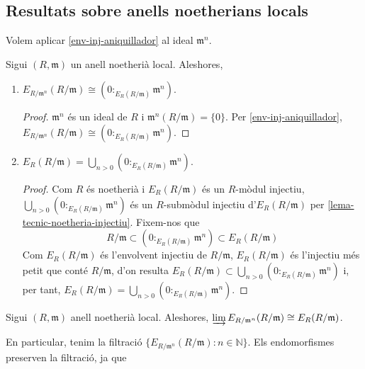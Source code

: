 \subsection{Resultats sobre anells noetherians locals}
Volem aplicar \ref{env-inj-aniquillador} al ideal $\mathfrak{m}^{n}$.
\begin{proposicio}
    Sigui $(R,\mathfrak{m})$ un anell noetherià local. Aleshores,
    \begin{enumerate}
        \item $E_{R/\mathfrak{m}^{n}}(R/\mathfrak{m})\cong(0:_{E_{R}(R/\mathfrak{m})}\mathfrak{m}^{n})$.
        \begin{proof}
            $\mathfrak{m}^{n}$ és un ideal de $R$ i $\mathfrak{m}^{n}(R/\mathfrak{m})=\{0\}$. Per \ref{env-inj-aniquillador}, $E_{R/\mathfrak{m}^{n}}(R/\mathfrak{m})\cong(0:_{E_{R}(R/\mathfrak{m})}\mathfrak{m}^{n})$.
        \end{proof}
        \item $E_{R}(R/\mathfrak{m})=\bigcup_{n>0}(0:_{E_{R}(R/\mathfrak{m})}\mathfrak{m}^{n})$.
        \begin{proof}
        Com $R$ és noetherià i $E_{R}(R/\mathfrak{m})$ és un $R$-mòdul injectiu, $\bigcup_{n>0}(0:_{E_{R}(R/\mathfrak{m})}\mathfrak{m}^{n})$ és un $R$-submòdul injectiu d'$E_{R}(R/\mathfrak{m})$ per \ref{lema-tecnic-noetheria-injectiu}. Fixem-nos que
        \begin{equation*}
            R/\mathfrak{m}\subset(0:_{E_{R}(R/\mathfrak{m})}\mathfrak{m}^{n})\subset E_{R}(R/\mathfrak{m})
        \end{equation*}
        Com $E_{R}(R/\mathfrak{m})$ és l'envolvent injectiu de $R/\mathfrak{m}$, $E_{R}(R/\mathfrak{m})$ és l'injectiu més petit que conté $R/\mathfrak{m}$, d'on resulta $E_{R}(R/\mathfrak{m})\subset\bigcup_{n>0}(0:_{E_{R}(R/\mathfrak{m})}\mathfrak{m}^{n})$ i, per tant, $E_{R}(R/\mathfrak{m})=\bigcup_{n>0}(0:_{E_{R}(R/\mathfrak{m})}\mathfrak{m}^{n})$.
    \end{proof}
    \end{enumerate}
\end{proposicio}
\begin{corolari}\label{lim-inj-envolvent-cos-residual}
    Sigui $(R,\mathfrak{m})$ anell noetherià local. Aleshores, $\varinjlim E_{R/\mathfrak{m}^{n}}(R/\mathfrak{m})\cong E_{R}(R/\mathfrak{m})$.
\end{corolari}
En particular, tenim la filtració $\{E_{R/\mathfrak{m}^{n}}(R/\mathfrak{m}):n\in\mathbb{N}\}$. Els endomorfismes preserven la filtració, ja que
